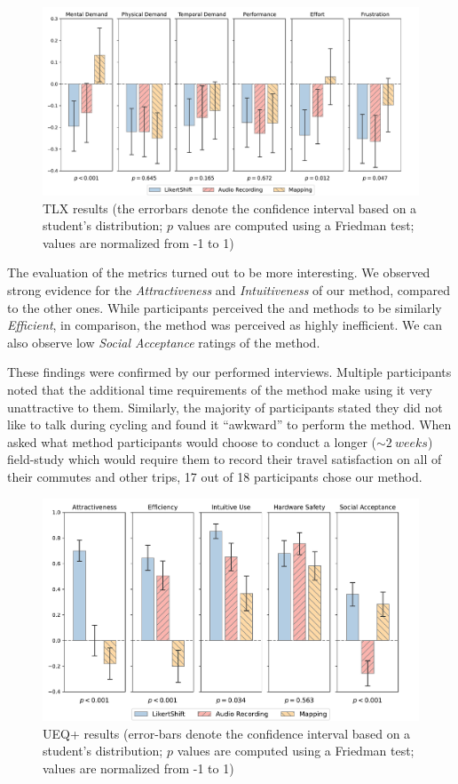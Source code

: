 \begin{figure}[!htb]
    \centering
    \includegraphics[height=0.5\linewidth]{../evaluation/eval_tlx.pdf}
    \caption{TLX results (the errorbars denote the confidence interval based on a student's distribution; $p$ values are computed using a Friedman test; values are normalized from -1 to 1)}
    \label{fig:eval_tlx}
\end{figure}

\bigbreak\noindent
The evaluation of the  metrics turned out to be more interesting.
We observed strong evidence for the \textit{Attractiveness} and \textit{Intuitiveness} of our \likertshift method, compared to the other ones.
While participants perceived the \likertshift and \audiorecording methods to be similarly \textit{Efficient}, in comparison, the \mapping method was perceived as highly inefficient.
We can also observe low \textit{Social Acceptance} ratings of the \audiorecording method.

These findings were confirmed by our performed interviews.
Multiple participants noted that the additional time requirements of the \mapping method make using it very unattractive to them.
Similarly, the majority of participants stated they did not like to talk during cycling and found it “awkward” to perform the \audiorecording method.
When asked what method participants would choose to conduct a longer ($\sim\SI{2}{weeks}$) field-study which would require them to record their travel satisfaction on all of their commutes and other trips, 17 out of 18 participants chose our \likertshift method.

\begin{figure}[!htb]
    \centering
    \includegraphics[height=0.5\linewidth]{../evaluation/eval_ueq.pdf}
    \caption{UEQ+ results (error-bars denote the confidence interval based on a student's distribution; $p$ values are computed using a Friedman test; values are normalized from -1 to 1)}
    \label{fig:eval_ueq}
\end{figure}
